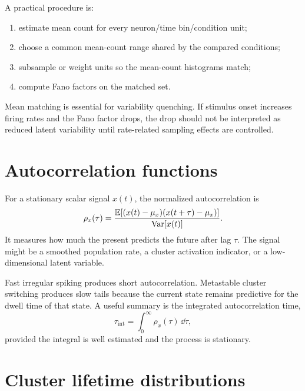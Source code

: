 A practical procedure is:
\begin{enumerate}[leftmargin=*]
  \item estimate mean count for every neuron/time bin/condition unit;
  \item choose a common mean-count range shared by the compared conditions;
  \item subsample or weight units so the mean-count histograms match;
  \item compute Fano factors on the matched set.
\end{enumerate}

Mean matching is essential for variability quenching. If stimulus onset increases firing rates and the Fano factor drops, the drop should not be interpreted as reduced latent variability until rate-related sampling effects are controlled.

\section{Autocorrelation functions}
\label{sec:autocorrelation-functions}

For a stationary scalar signal $x(t)$, the normalized autocorrelation is
%
\begin{equation}
  \rho_x(\tau)=
  \frac{\mathbb{E}[(x(t)-\mu_x)(x(t+\tau)-\mu_x)]}{\operatorname{Var}[x(t)]}.
  \label{eq:autocorrelation}
\end{equation}
%
It measures how much the present predicts the future after lag $\tau$. The signal might be a smoothed population rate, a cluster activation indicator, or a low-dimensional latent variable.

Fast irregular spiking produces short autocorrelation. Metastable cluster switching produces slow tails because the current state remains predictive for the dwell time of that state. A useful summary is the integrated autocorrelation time,
%
\begin{equation}
  \tau_{\mathrm{int}}=\int_0^\infty \rho_x(\tau)\,\dd\tau,
  \label{eq:integrated-autocorrelation-time}
\end{equation}
%
provided the integral is well estimated and the process is stationary.

\section{Cluster lifetime distributions}
\label{sec:cluster-lifetime-distributions}

